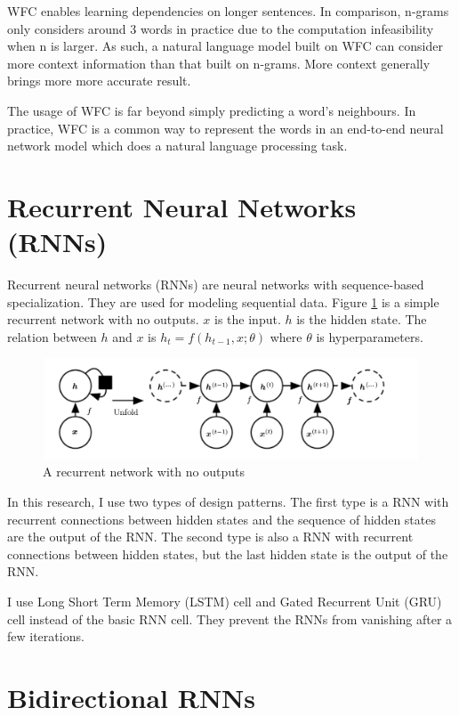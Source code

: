 \documentclass[modernstyle,12pt]{sjsuthesis}
\theoremstyle{definition}
\begin{document}
WFC enables learning dependencies on longer sentences. In comparison, n-grams only considers around 3 words in practice due to the computation infeasibility when n is larger. As such, a natural language model built on WFC can consider more context information than that built on n-grams. More context generally brings more more accurate result.

The usage of WFC is far beyond simply predicting a word's neighbours. In practice, WFC is a common way to represent the words in an end-to-end neural network model which does a natural language processing task.

\section{Recurrent Neural Networks (RNNs)}\label{sect:rnn}
Recurrent neural networks (RNNs) \cite{rumelhart1986learning} are neural networks with sequence-based specialization. They are used for modeling sequential data. Figure \ref{f:rnnWithNoOutputs} is a simple recurrent network with no outputs. $x$ is the input. $h$ is the hidden state. The relation between $h$ and $x$ is $h_t = f(h_{t-1}, x; \theta)$ where $\theta$ is hyperparameters.

\begin{figure}[htbp]\centering
  \includegraphics[width=12cm, height=3cm]{figures/rnnWithNoOutputs}
  \caption{A recurrent network with no outputs\cite{bengio2003neural}}
  \label{f:rnnWithNoOutputs}
\end{figure}

In this research, I use two types of design patterns. The first type is a RNN with recurrent connections between hidden states and the sequence of hidden states are the output of the RNN. The second type is also a RNN with recurrent connections between hidden states, but the last hidden state is the output of the RNN.

I use Long Short Term Memory (LSTM) cell and Gated Recurrent Unit (GRU) cell instead of the basic RNN cell. They prevent the RNNs from vanishing after a few iterations.

\section{Bidirectional RNNs}
\end{document}
